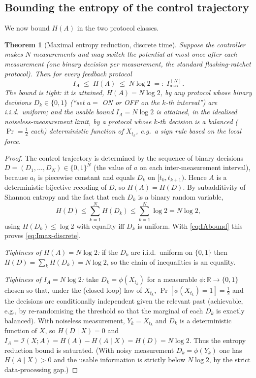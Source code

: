 \documentclass{amsart}
\newtheorem{theorem}{Theorem}
\theoremstyle{definition}
\newcommand{\R}{\mathbb{R}}
\begin{document}
\subsection{Bounding the entropy of the control trajectory}

We now bound $H(A)$ in the two protocol classes.

\begin{theorem}[Maximal entropy reduction, discrete time]\label{thm:Imax-discrete}
Suppose the controller makes $N$ measurements and may switch the potential at
most once after each measurement (one binary decision per measurement, the
standard flashing-ratchet protocol). Then for every feedback protocol
\begin{equation}\label{eq:Imax-discrete}
I_A \;\le\; H(A) \;\le\; N\log 2 \;=:\; I_{\max}^{(N)} .
\end{equation}
The bound is tight: it is attained, $H(A)=N\log 2$, by any protocol whose
binary decisions $D_k\in\{0,1\}$ (``set $a=$ ON or OFF on the $k$-th
interval'') are i.i.d.\ uniform; and the \emph{usable} bound $I_A=N\log2$ is
attained, in the idealised noiseless-measurement limit, by a protocol whose
$k$-th decision is a balanced ($\Pr=\tfrac12$ each) deterministic function of
$X_{t_k}$, e.g.\ a sign rule based on the local force.
\end{theorem}

\begin{proof}
The control trajectory is determined by the sequence of binary decisions
$D=(D_1,\dots,D_N)\in\{0,1\}^N$ (the value of $a$ on each inter-measurement
interval), because $a_t$ is piecewise constant and equals $D_k$ on
$[t_k,t_{k+1})$. Hence $A$ is a deterministic bijective recoding of $D$, so
$H(A)=H(D)$. By subadditivity of Shannon entropy and the fact that each $D_k$
is a binary random variable,
\[
H(D)\le\sum_{k=1}^N H(D_k)\le \sum_{k=1}^N \log 2 = N\log 2,
\]
using $H(D_k)\le\log 2$ with equality iff $D_k$ is uniform. With
\eqref{eq:IAbound} this proves \eqref{eq:Imax-discrete}.

\emph{Tightness of $H(A)=N\log2$:} if the $D_k$ are i.i.d.\ uniform on
$\{0,1\}$ then $H(D)=\sum_k H(D_k)=N\log2$, so the chain of inequalities is an
equality.

\emph{Tightness of $I_A=N\log 2$:} take $D_k=\phi(X_{t_k})$ for a measurable
$\phi:\R\to\{0,1\}$ chosen so that, under the (closed-loop) law of $X_{t_k}$,
$\Pr[\phi(X_{t_k})=1]=\tfrac12$ and the decisions are conditionally
independent given the relevant past (achievable, e.g., by re-randomising the
threshold so that the marginal of each $D_k$ is exactly balanced). With
noiseless measurement, $Y_k=X_{t_k}$ and $D_k$ is a deterministic function of
$X$, so $H(D\mid X)=0$ and
$I_A=\mathcal I(X;A)=H(A)-H(A\mid X)=H(D)=N\log2$. Thus the entropy reduction
bound is saturated. (With noisy measurement $D_k=\phi(Y_k)$ one has
$H(A\mid X)>0$ and the usable information is strictly below $N\log2$, by the
strict data-processing gap.)
\end{proof}
\end{document}
